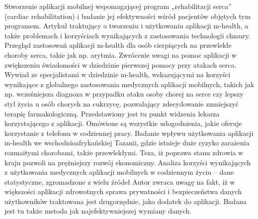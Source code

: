 \cite{BCDPfaeffli2012AmHealthcardiacrehabilitationexerciseintervention:findingsfromcontentdevelopmentstudiesCardiacrehabilitation;Exercise;Telemedicine;Internet}Stworzenie aplikacji mobilnej wspomagającej program „rehabilitacji serca” (cardiac rehabilitation) i badanie jej efektywności wśród pacjentów objętych tym programem.
\cite{BIRajan2012ThePromiseofWireless:AnOverviewofaDevice-To-CloudmHealthSolutionControlInstrumentationSurgicalimplantsMonitoringBusinessJourneysHealthcareSubsidiaries} Artykuł traktujący o tworzeniu i użytkowaniu aplikacji m-health, a także problemach i korzyściach wynikających z zastosowania technologii chmury.
\cite{ICHoneyman2014Mobilehealthapplicationsincardiaccare} Przegląd zastosowań aplikacji m-health dla osób cierpiących na przewlekłe choroby serca, takie jak np. arytmia. Zwrócenie uwagi na pomoc aplikacji w zwiększeniu świadomości w dziedzinie pierwszej pomocy przy atakach serca.
\cite{BISikka2012TheFutureofMedicine:TheEmergencyRoomAndMobileHealthInstrumentationTrackingMonitoringEmergenciesHealthcareHealthEmergencymedicalservicesHospitals} Wywiad ze specjalistami w dziedzinie m-health, wskazującymi na korzyści wynikające z globalnego zastosowania medycznych aplikacji mobilnych, takich jak np. wcześniejsza diagnoza w przypadku ataku osoby chorej na serce czy lepszy styl życia u osób chorych na cukrzycę, pozwalający zdecydowanie zmniejszyć terapię farmakologiczną.
\cite{MEPeck2012LivelifeuntetheredwithmobilehealthappsUnitedStates--USPhysiciansSmartphonesCellularPhonePhysiciansPrimaryCareSoftwareutilitiesHumansUnitedStatesElectronichealthrecordsPracticeManagementMedicalPortablecomputersMedicalInformaticsSoftware} Przedstawiony jest tu punkt widzenia lekarza korzystającego z aplikacji. Omówione są wszystkie udogodnienia, jakie oferuje korzystanie z telefonu w codziennej pracy.
\cite{PPRModi2013MobileHealthTechnologyinDevelopingCountries:TheCaseofTanzaniaWorldHealthOrganizationTanzaniaPublichealthHumanimmunodeficiencyvirus--HIVAcquiredimmunedeficiencysyndrome--AIDSCellulartelephonesDevelopingcountries--LDCs} Badanie wpływu użytkowania aplikacji m-health we wschodnioafrykańskiej Tazanii, gdzie istnieje duże ryzyko zarażenia rozmaitymi chorobami, także przewlekłymi. Teza, iż poprawa stanu zdrowia w kraju pozwoli na prężniejszy rozwój ekonomiczny.
\cite{PMFree2012TheEffectivenessofMobile-HealthTechnology-BasedHealthBehaviourChangeorDiseaseManagementInterventionsforHealthCareConsumers} Analiza korzyści wynikających z użytkowania medycznych aplikacji mobilnych w codziennym życiu – dane statystyczne, zgromadzone z wielu źródeł
\cite{PDaTMurad2014TheimpactofmobilehealthapplicationsonemergencymedicalservicesandpatientinformationprivacyHealthcaremanagementGeographicinformationscienceComputerscienceInformationTechnology} Autor zwraca uwagę na fakt, iż w większości aplikacji zdrowotnych sprawa prywatności i bezpieczeństwa danych użytkowników traktowana jest drugorzędnie, jako dodatek do aplikacji. Badana jest tu także metoda jak najefektywniejszej wymiany danych.
